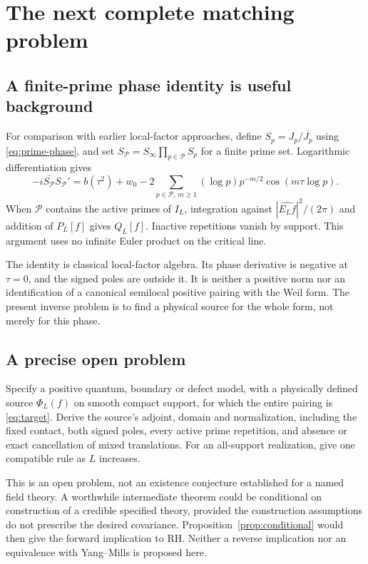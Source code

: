 \section{The next complete matching problem}\label{sec:outlook}
\subsection{A finite-prime phase identity is useful background}
For comparison with earlier local-factor approaches, define
$S_p=J_p/\overline{J_p}$ using \eqref{eq:prime-phase}, and set
$S_{\mathcal P}=S_\infty\prod_{p\in\mathcal P}S_p$ for a finite prime
set. Logarithmic differentiation gives
\begin{equation}\label{eq:finite-phase}
 -i\overline{S_{\mathcal P}}S_{\mathcal P}'
 =b(\tau^2)+w_0
 -2\sum_{p\in\mathcal P,\,m\geq1}(\log p)p^{-m/2}
                         \cos(m\tau\log p).
\end{equation}
When $\mathcal P$ contains the active primes of $I_L$, integration
against $|\widehat{E_Lf}|^2/(2\pi)$ and addition of $P_L[f]$ gives
$Q_L[f]$. Inactive repetitions vanish by support. This argument uses
no infinite Euler product on the critical line.

The identity is classical local-factor algebra. Its phase derivative
is negative at $\tau=0$, and the signed poles are outside it. It is
neither a positive norm nor an identification of a canonical semilocal
positive pairing with the Weil form. The present inverse problem is
to find a physical source for the whole form, not merely for this phase.

\subsection{A precise open problem}
\begin{problem}\label{prob:joint}
Specify a positive quantum, boundary or defect model, with a physically
defined source $\Phi_L(f)$ on smooth compact support, for which the
entire pairing is \eqref{eq:target}. Derive the source's adjoint,
domain and normalization, including the fixed contact, both signed
poles, every active prime repetition, and absence or exact cancellation
of mixed translations. For an all-support realization, give one
compatible rule as $L$ increases.
\end{problem}

This is an open problem, not an existence conjecture established for
a named field theory. A worthwhile intermediate theorem could be
conditional on construction of a credible specified theory, provided
the construction assumptions do not prescribe the desired covariance.
Proposition~\ref{prop:conditional} would then give the forward
implication to RH. Neither a reverse implication nor an equivalence
with Yang--Mills is proposed here.

